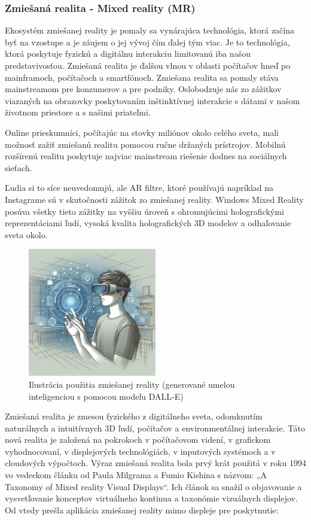 \subsubsection{Zmiešaná realita - Mixed reality (MR)}

Ekosystém zmiešanej reality je pomaly sa vynárajúca technológia, ktorá začína byť na vzostupe a je záujem o jej vývoj čím ďalej tým viac. Je to technológia, ktorá poskytuje fyzickú a digitálnu interakciu limitovanú iba našou predstavivosťou. Zmiešaná realita je ďalšou vlnou v oblasti počítačov hneď po mainframoch, počítačoch a smartfónoch. Zmiešana realita sa pomaly stáva mainstreamom pre konzumerov a pre podniky. Oslobodzuje nás zo zážitkov viazaných na obrazovky poskytovaním inštinktívnej interakcie s dátami v našom životnom priestore a s našimi priateľmi. 

Online prieskumníci, počítajúc na stovky miliónov okolo celého sveta, mali možnosť zažiť zmiešanú realitu pomocou ručne držaných prístrojov. Mobilnú rozšírenú realitu poskytuje najviac mainstream riešenie dodnes na sociálnych sieťach. 

Ľudia si to síce neuvedomujú, ale AR filtre, ktoré používajú napríklad na Instagrame sú v skutočnosti zážitok zo zmiešanej reality. Windows Mixed Reality posúva všetky tieto zážitky na vyššiu úroveň s ohromujúcimi holografickými reprezentáciami ľudí, vysoká kvalita holografických 3D modelov a odhaľovanie sveta okolo.

\begin{figure}[h]
  \centering
  \includegraphics[width=0.5\textwidth]{img/zmiesana_realita.png}
  \caption{Ilustrácia použitia zmiešanej reality (generované umelou inteligenciou s pomocou modelu DALL-E)}
  \label{fig:mix_real}
\end{figure}

Zmiešaná realita je zmesou fyzického z digitálneho sveta, odomknutím naturálnych a intuitívnych 3D ľudí, počítačov a environmentálnej interakcie. Táto nová realita je založená na pokrokoch v počítačovom videní, v grafickom vyhodnocovaní, v displejových technológiách, v inputových systémoch a v cloudových výpočtoch. Výraz zmiešaná realita bola prvý krát použitá v roku 1994 vo vedeckom článku od Paula Milgrama a Fumio Kishina s názvom: „A Taxonomy of Mixed reality Visual Displays“. Ich článok sa snažil o objavovanie a vysvetľovanie konceptov virtuálneho kontinua a taxonómie vizuálnych displejov. Od vtedy prešla aplikácia zmiešanej reality mimo displeje pre poskytnutie:

